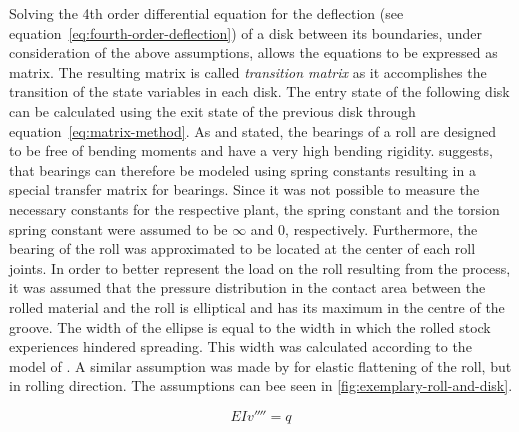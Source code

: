\documentclass[11pt]{PyRollDocs}
\begin{document}
    Solving the 4th order differential equation for the deflection (see equation~\eqref{eq:fourth-order-deflection}) of a disk between its boundaries,
    under consideration of the above assumptions, allows the equations to be expressed as matrix.
    The resulting matrix is called \emph{transition matrix} as it accomplishes the transition of the state variables in each disk.
    The entry state of the following disk can be calculated using the exit state of the previous disk through equation~\eqref{eq:matrix-method}.
    As \textcite{Becker_König_Guericke_Hinkfoth_1979} and \textcite{Kulbatschny_1954} stated,
    the bearings of a roll are designed to be free of bending moments and have a very high bending rigidity.
    \textcite{Göldner_Holzweißig_1989} suggests,
    that bearings can therefore be modeled using spring constants resulting in a special transfer matrix for bearings.
    Since it was not possible to measure the necessary constants for the respective plant, the spring constant and the
    torsion spring constant were assumed to be $\infty$ and $0$, respectively.
    Furthermore, the bearing of the roll was approximated to be located at the center of each roll joints.
    In order to better represent the load on the roll resulting from the process,
    it was assumed that the pressure distribution in the contact area between the rolled material and the roll is elliptical and has its maximum in the centre of the groove.
    The width of the ellipse is equal to the width in which the rolled stock experiences hindered spreading.
    This width was calculated according to the model of \textcite{Lendl_1948a}.
    A similar assumption was made by \textcite{Hitchcock_Trinks_1935} for elastic flattening of the roll, but in rolling direction.
    The assumptions can bee seen in \autoref{fig:exemplary-roll-and-disk}.

    \begin{equation}
        E I v '''' = q
        \label{eq:fourth-order-deflection}
    \end{equation}
\end{document}
